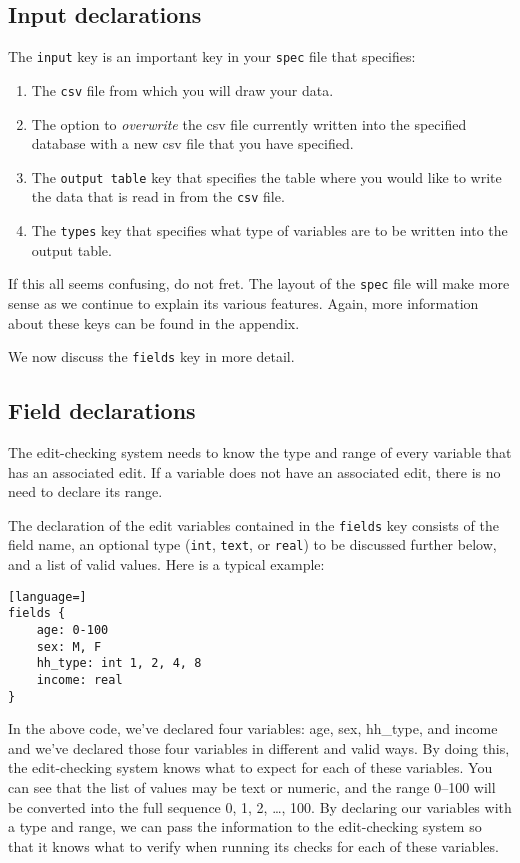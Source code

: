 \documentclass{article}
\begin{document}
\subsection{Input declarations}
The {\tt input} key is an important key in your {\tt spec} file that specifies:
\begin{enumerate}
\item The {\tt csv} file from which you will draw your data.
\item The option to \textit{overwrite} the csv file currently written into the specified database with 
a new csv file that you have specified.
\item The {\tt output table} key that specifies the table where you would like to 
write the data that is read in from the {\tt csv} file.
\item The {\tt types} key that specifies what type of variables are to be written 
into the output table.
\end{enumerate}

If this all seems confusing, do not fret. The layout of the {\tt spec} file will make more sense 
as we continue to explain its various features. Again, more information about these keys can be 
found in the appendix.

We now discuss the {\tt fields} key in more detail.


\subsection{Field declarations} The edit-checking system needs to know the type and range
of every variable that has an associated edit. If a variable does not have an associated
edit, there is no need to declare its range.

The declaration of the edit variables contained in the {\tt fields} key consists of the field name, 
an optional type ({\tt int}, {\tt text}, or 
{\tt real}) to be discussed further below, and a list of valid values. Here is a typical example:

\begin{lstlisting}[language=]
fields {
    age: 0-100
    sex: M, F
    hh_type: int 1, 2, 4, 8
    income: real
}
\end{lstlisting}

In the above code, we've declared four variables: age, sex, hh\_type, and income and we've 
declared those four variables in different and valid ways. By doing this, the edit-checking system 
knows what to expect for each of these variables. You can see that the list of values may be text 
or numeric, and the range 0--100 will be converted into the full sequence 0, 1, 2, \dots, 100. 
By declaring our variables with a type and range, we can pass the information to the edit-checking system 
so that it knows what to verify when running its checks for each of these variables. 
\end{document}
